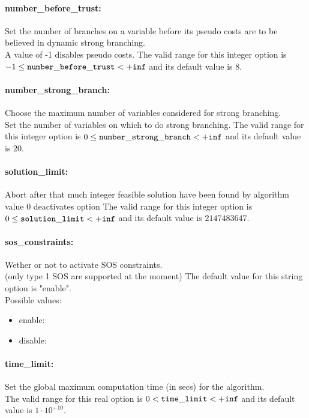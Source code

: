 \paragraph{number\_before\_trust:} Set the number of branches on a variable before its pseudo costs are to be believed in dynamic strong branching. $\;$ \\
 A value of -1 disables pseudo costs. The valid range for this integer option is
$-1 \le {\tt number\_before\_trust } <  {\tt +inf}$
and its default value is $8$.


\paragraph{number\_strong\_branch:} Choose the maximum number of variables considered for strong branching. $\;$ \\
 Set the number of variables on which to do strong
branching. The valid range for this integer option is
$0 \le {\tt number\_strong\_branch } <  {\tt +inf}$
and its default value is $20$.


\paragraph{solution\_limit:} Abort after that much integer feasible solution have been found by algorithm $\;$ \\
 value 0 deactivates option The valid range for this integer option is
$0 \le {\tt solution\_limit } <  {\tt +inf}$
and its default value is $2147483647$.


\paragraph{sos\_constraints:} Wether or not to activate SOS constraints. $\;$ \\
 (only type 1 SOS are supported at the moment)
The default value for this string option is "enable".
\\ 
Possible values:
\begin{itemize}
   \item enable: 
   \item disable: 
\end{itemize}

\paragraph{time\_limit:} Set the global maximum computation time (in secs) for the algorithm. $\;$ \\
 The valid range for this real option is 
$0 <  {\tt time\_limit } <  {\tt +inf}$
and its default value is $1 \cdot 10^{+10}$.


